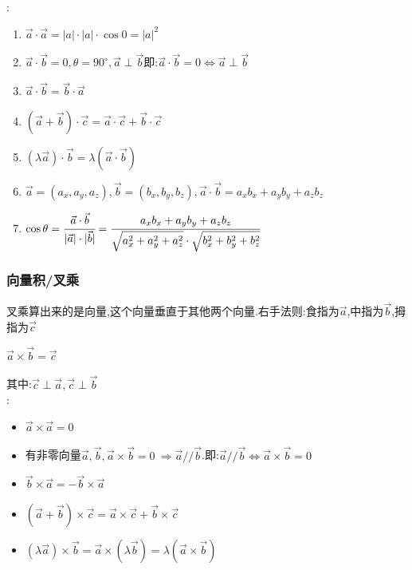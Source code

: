 \documentclass[UTF8,12pt]{ctexbook}
\newcommand{\degree}{^\circ}
\begin{document}
{{{{      :
      \begin{enumerate}
        \item $\vec{a}\cdot\vec{a} = |a|\cdot|a|\cdot\cos0 = |a|^2$
        \item $\vec{a}\cdot\vec{b} = 0,\theta = 90\degree,\vec{a} \perp \vec{b}$\qquad 即:$\vec{a}\cdot\vec{b} = 0 \Leftrightarrow \vec{a} \perp \vec{b}$
        \item $\vec{a}\cdot\vec{b} = \vec{b}\cdot\vec{a}$
        \item $(\vec{a}+\vec{b})\cdot\vec{c} = \vec{a}\cdot\vec{c} + \vec{b}\cdot\vec{c}$
        \item $(\lambda\vec{a})\cdot\vec{b} = \lambda(\vec{a}\cdot\vec{b})$
        \item $\vec{a} = (a_x,a_y,a_z),\vec{b} = (b_x,b_y,b_z),\vec{a}\cdot\vec{b} = a_xb_x + a_yb_y + a_zb_z$
        \item $\cos\theta = \cfrac{\vec{a}\cdot\vec{b}}{|\vec{a}|\cdot|\vec{b}|} = \cfrac{a_xb_x + a_yb_y + a_zb_z}{\sqrt{a_x^2 + a_y^2 + a_z^2}\cdot\sqrt{b_x^2 + b_y^2 + b_z^2}}$
      \end{enumerate}

    }%

    \subsubsection{向量积/叉乘}{
      叉乘算出来的是向量,这个向量垂直于其他两个向量.右手法则:食指为$\vec{a}$,中指为$\vec{b}$,拇指为$\vec{c}$

      $\vec{a}\times\vec{b} = \vec{c}$

      其中:$\vec{c}\perp\vec{a},\vec{c}\perp\vec{b}$\\

      :
      \begin{itemize}
        \item $\vec{a}\times\vec{a} = 0$
        \item 有非零向量$\vec{a},\vec{b},\vec{a}\times\vec{b} = 0\ \Rightarrow \vec{a} // \vec{b}$.即:$\vec{a} // \vec{b} \Leftrightarrow \vec{a} \times \vec{b} = 0$
        \item $\vec{b}\times\vec{a} = -\vec{b}\times\vec{a}$
        \item $(\vec{a} + \vec{b})\times\vec{c} = \vec{a} \times \vec{c} + \vec{b} \times \vec{c}$
        \item $(\lambda\vec{a})\times\vec{b} = \vec{a} \times (\lambda\vec{b}) = \lambda(\vec{a}\times\vec{b})$
      \end{itemize}

}}}}
\end{document}
